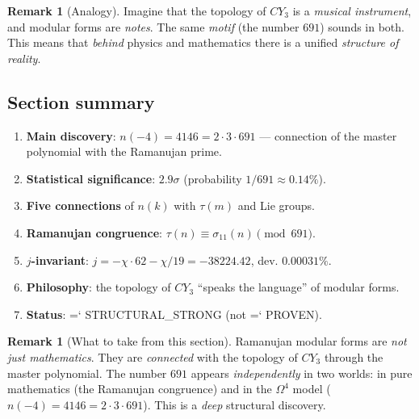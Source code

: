 \documentclass[11pt,a4paper]{article}
\newcommand{\CY}{CY_3}
\newcommand{\Om}{\Omega^4}
\renewcommand{\texttt}[1]{{\ttfamily\hyphenchar\font=`\- #1}}
\theoremstyle{definition}
\newtheorem{remark}[theorem]{Remark}
\begin{document}
\begin{remark}[Analogy]
\label{rem:modular-analogy}
Imagine that the topology of $\CY$ is a \emph{musical 
instrument}, and modular forms are \emph{notes}. 
The same \emph{motif} (the number $691$) sounds in both. 
This means that \emph{behind} physics and mathematics there is 
a unified \emph{structure of reality}.
\end{remark}

\subsection{Section summary}
\label{subsec:modular-summary}

\begin{enumerate}
    \item \textbf{Main discovery}: 
          $n(-4) = 4146 = 2 \cdot 3 \cdot 691$ — connection 
          of the master polynomial with the Ramanujan prime.
    \item \textbf{Statistical significance}: 
          $2.9\sigma$ (probability $1/691 \approx 0.14\%$).
    \item \textbf{Five connections} of $n(k)$ with $\tau(m)$ and Lie groups.
    \item \textbf{Ramanujan congruence}: 
          $\tau(n) \equiv \sigma_{11}(n) \pmod{691}$.
    \item \textbf{$j$-invariant}: 
          $j = -\chi \cdot 62 - \chi/19 = -38224.42$, 
          dev. $0.00031\%$.
    \item \textbf{Philosophy}: the topology of $\CY$ ``speaks the language'' 
          of modular forms.
    \item \textbf{Status}: \texttt{STRUCTURAL\_STRONG} 
          (not \texttt{PROVEN}).
\end{enumerate}

\begin{remark}[What to take from this section]
\label{rem:modular-takeaway}
Ramanujan modular forms are \emph{not just mathematics}. 
They are \emph{connected} with the topology of $\CY$ through the master 
polynomial. The number $691$ appears \emph{independently} in two worlds: 
in pure mathematics (the Ramanujan congruence) and in the $\Om$ model 
($n(-4) = 4146 = 2 \cdot 3 \cdot 691$). 
This is a \emph{deep} structural discovery.
\end{remark}
\end{document}
